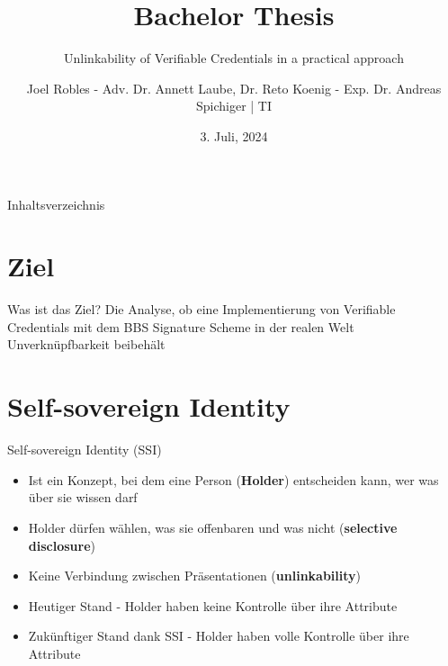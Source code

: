 \documentclass[
	german,%
	authorontitle=true,
	]{bfhbeamer}
\title{Bachelor Thesis}
\subtitle{Unlinkability of Verifiable Credentials in a practical approach}
\author[J. Robles]{Joel Robles - Adv. Dr. Annett Laube, Dr. Reto Koenig - Exp. Dr. Andreas Spichiger | TI}
\date{3. Juli, 2024}
\begin{document}
\maketitle

\begin{frame}{Inhaltsverzeichnis}
    \tableofcontents
\end{frame}

\section{Ziel}

\begin{frame}{Was ist das Ziel?}
    \centering
    Die Analyse, ob eine Implementierung von Verifiable Credentials mit dem BBS Signature Scheme in der realen Welt Unverknüpfbarkeit beibehält
\end{frame}

\section{Self-sovereign Identity}

\begin{frame}{Self-sovereign Identity (SSI)}
    \begin{itemize}
        \item Ist ein Konzept, bei dem eine Person (\textbf{Holder}) entscheiden kann, wer was über sie wissen darf
        \item Holder dürfen wählen, was sie offenbaren und was nicht (\textbf{selective disclosure})
        \item Keine Verbindung zwischen Präsentationen (\textbf{unlinkability})
        \item Heutiger Stand - Holder haben keine Kontrolle über ihre Attribute
        \item Zukünftiger Stand dank SSI - Holder haben volle Kontrolle über ihre Attribute
    \end{itemize}
\end{frame}
\end{document}
